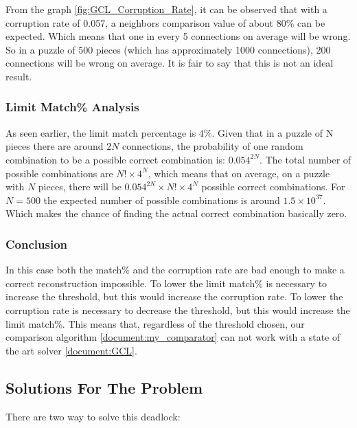 \documentclass{article}
\begin{document}
From the graph \ref{fig:GCL_Corruption_Rate}, it can be observed that with a corruption rate of 0.057,
a neighbors comparison value of about 80\%
can be expected. Which means that one in every 5 connections on average will be wrong.
So in a puzzle of 500 pieces (which has approximately 1000 connections),
200 connections will be wrong on average.
It is fair to say that this is not an ideal result.


\subsubsection{Limit Match\% Analysis}
As seen earlier, the limit match percentage is \(4\%\).\newline \newline
Given that in a puzzle of N pieces there are around \(2N \) connections,
the probability of one random combination to be a
possible correct combination is: \(0.054^{2N}\).\newline \newline
The total number of possible combinations are \(N! \times 4^N\),
which means that on average, on a puzzle with \(N\) pieces,
there will be \(0.054^{2N} \times N! \times 4^N \)
possible correct combinations.\newline \newline
For \( N = 500 \) the expected number of possible combinations is around \( 1.5 \times 10^{37} \).
Which makes the chance of finding the actual correct combination basically zero.
\subsubsection{Conclusion}
In this case both the match\% and the corruption rate are bad enough to make a correct reconstruction impossible.
To lower the limit match\% is necessary to increase the threshold, but this would increase the corruption rate.
To lower the corruption rate is necessary to decrease the threshold, but this would increase the limit match\%.
This means that, regardless of the threshold chosen, our comparison algorithm \ref{document:my_comparator}
can not work with a state of the art solver \ref{document:GCL}.

\subsection{Solutions For The Problem}

There are two way to solve this deadlock:
\end{document}
